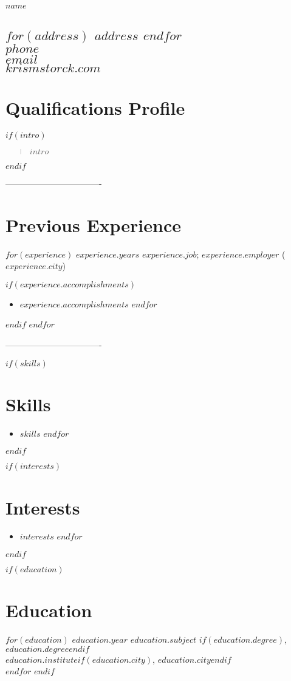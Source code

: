\documentclass[$fontsize$, a4paper]{article}
\begin{document}
{\Huge $name$}
\vspace{-10pt}

\subsection*{
$for(address)$
$address$ 
$endfor$\\
$phone$ \\
\href{mailto:$email$}{$email$} \\
\href{url:$website$}{$krismstorck.com$}}
\vspace{5pt}

\section*{Qualifications Profile}
\vspace{-5pt}
$if(intro)$
\begin{quote}
{$intro$}
\end{quote}
$endif$

\centerline{----------------------------------}

\section*{Previous Experience}
\noindent
$for(experience)$
{\large $experience.years$}
\emph{$experience.job$};
\textsc{$experience.employer$} ($experience.city$)


$if(experience.accomplishments)$
\begin{itemize}
    $for(experience.accomplishments)$
      \item $experience.accomplishments$
    $endfor$
\end{itemize}
$endif$
$endfor$

\centerline{----------------------------------}

$if(skills)$
\section*{Skills}
\begin{itemize}
    $for(skills)$
      \item $skills$
    $endfor$
\end{itemize}
$endif$

$if(interests)$
\section*{Interests}
\begin{itemize}
    $for(interests)$
      \item $interests$
    $endfor$
\end{itemize}
$endif$


$if(education)$
\section*{Education}
\noindent
$for(education)$
\textsc{\large $education.year$}
\textbf{$education.subject$}
$if(education.degree)$, $education.degree$$endif$\\
\emph{$education.institute$}$if(education.city)$, $education.city$$endif$\\[.2cm]
$endfor$
$endif$
\end{document}
